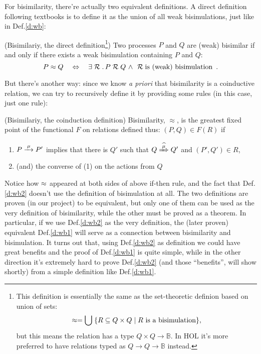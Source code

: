For bisimilarity, there're actually two equivalent definitions. A direct definition following textbooks
is to define it as the union of all weak bisimulations, just like in Def.\;\ref{d:wb}:
\begin{definition}{(Bisimilariy, the direct definition\footnote{This definition is essentially the same as the set-theoretic definion based on union of sets:
\begin{equation*}
\approx = \bigcup\; \{ R \subseteq Q \times Q \;|\; R \mbox{ is a bisimulation}\},
\end{equation*}
but this means the relation has a type $Q\times Q\rightarrow\mathbb{B}$. In HOL it's more preferred to have relations typed as $Q\rightarrow Q\rightarrow\mathbb{B}$ instead.})}
\label{d:wb1}
Two processes $P$ and $Q$ are (weak) bisimilar if and only if there exists
a weak bisimulation containing $P$ and $Q$:
\begin{equation}
P \approx Q \quad\Leftrightarrow\quad\exists \mathrel{\cal R}.\, P \mathrel{\cal R} Q \ \wedge\ \mathrel{\cal R} \mbox{is (weak) bisimulation}
\enspace.
\end{equation}
\end{definition}

But there's another way: since we know \emph{a priori} that bisimilarity is a coinductive relation, we can try to recursively define it by providing some rules (in this case, just one rule):
\begin{definition}{(Bisimilariy, the coinduction definition)}
\label{d:wb2}
Bisimilarity, $\approx$, is the greatest fixed point of the functional
$F$ on relations defined thus: $(P, Q) \in F(R)$ if 
\begin{enumerate}
\item $P \arr\mu P'$ implies that there is $Q'$ such that $Q \Arcap
  \mu Q'$ and $(P',Q')\in R$,
\item (and) the converse of (1) on the actions from $Q$
\end{enumerate}
\end{definition}
Notice how $\approx$ appeared at both sides of above if-then rule, and the
fact that Def.\;\ref{d:wb2} doesn't use the definition of bisimulation
at all.  The two definitions are proven (in our project) to be
equivalent, but only one of them can be used as the very definition of
bisimilarity, while the other must be proved as a theorem.  In
particular, if we use Def.\;\ref{d:wb2} as the very definition, the
(later proven) equivalent Def.\;\ref{d:wb1} will serve as a connection
between bisimilarity and bisimulation. It turns out that, using
Def.\;\ref{d:wb2} as definition we could have great benefits and the
proof of Def.\;\ref{d:wb1} is quite simple, while in the other
direction it's extremely hard to prove Def.\;\ref{d:wb2} (and those
``benefits'', will show shortly) from a simple definition like
Def.\;\ref{d:wb1}. 

